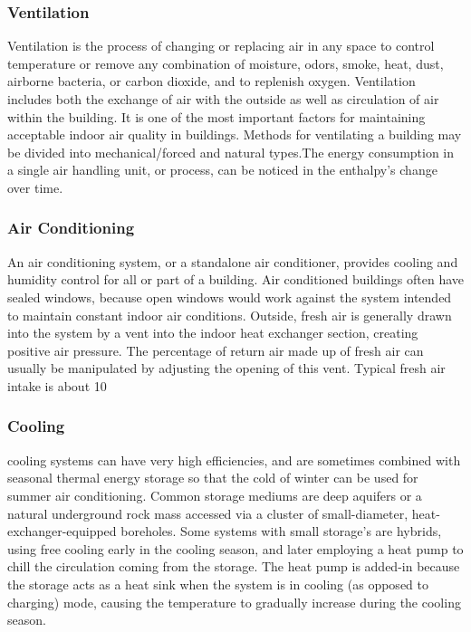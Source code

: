 \subsubsection{Ventilation }
Ventilation is the process of changing or replacing air in any space to control temperature or remove any combination of moisture, odors, smoke, heat, dust, airborne bacteria, or carbon dioxide, and to replenish oxygen. Ventilation includes both the exchange of air with the outside as well as circulation of air within the building. It is one of the most important factors for maintaining acceptable indoor air quality in buildings. Methods for ventilating a building may be divided into mechanical/forced and natural types.The energy consumption in a single air handling unit, or process, can be noticed in the
enthalpy’s change over time.

\subsubsection{Air Conditioning }
An air conditioning system, or a standalone air conditioner, provides cooling and humidity control for all or part of a building. Air conditioned buildings often have sealed windows, because open windows would work against the system intended to maintain constant indoor air conditions. Outside, fresh air is generally drawn into the system by a vent into the indoor heat exchanger section, creating positive air pressure. The percentage of return air made up of fresh air can usually be manipulated by adjusting the opening of this vent. Typical fresh air intake is about 10%

\subsubsection{Cooling}
cooling systems can have very high efficiencies, and are sometimes combined with seasonal thermal energy storage so that the cold of winter can be used for summer air conditioning. Common storage mediums are deep aquifers or a natural underground rock mass accessed via a cluster of small-diameter, heat-exchanger-equipped boreholes. Some systems with small storage's are hybrids, using free cooling early in the cooling season, and later employing a heat pump to chill the circulation coming from the storage. The heat pump is added-in because the storage acts as a heat sink when the system is in cooling (as opposed to charging) mode, causing the temperature to gradually increase during the cooling season.

